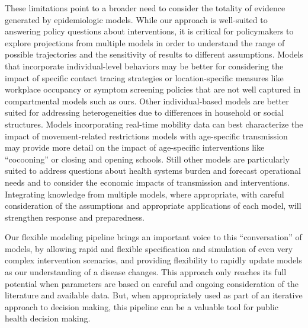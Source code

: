 {These limitations point to a broader need to consider the totality of evidence generated by epidemiologic models. While our approach is well-suited to answering policy questions about interventions, it is critical for policymakers to explore projections from multiple models in order to understand the range of possible trajectories and the sensitivity of results to different assumptions. Models that incorporate individual-level behaviors may be better for considering the impact of specific contact tracing strategies or location-specific measures like workplace occupancy or symptom screening policies that are not well captured in compartmental models such as ours\cite{Kucharski:EffectivenessIsolationTesting:2020,Firth:UsingRealworldNetwork:2020,Hinch:OpenABMCovid19AgentbasedModel:2020}. Other individual-based models are better suited for addressing heterogeneities due to differences in household or social structures\cite{Wilder:ModelingBetweenpopulationVariation:2020,Kerr:CovasimAgentbasedModel:2021}. Models incorporating real-time mobility data can best characterize the impact of movement-related restrictions\cite{Lai:EffectNonpharmaceuticalInterventions:2020} models with age-specific transmission may provide more detail on the impact of age-specific interventions like “cocooning”\cite{Duque:COVID19HowRelax:2020} or closing and opening schools\cite{Ferguson:ReportImpactNonpharmaceutical:2020}. Still other models are particularly suited to address questions about health systems burden and forecast operational needs\cite{Branas:FlatteningCurveIt:2020,LosAlamosNationalLaboratory:COVID19CasesDeaths,Weissman:LocallyInformedSimulation:2020} and to consider the economic impacts of transmission and interventions\cite{Acemoglu:OptimalTargetedLockdowns:2020,Silva:COVIDABSAgentbasedModel:2020}. Integrating knowledge from multiple models, where appropriate, with careful consideration of the assumptions and appropriate applications of each model, will strengthen response and preparedness\cite{Shea:HarnessingMultipleModels:2020}.


Our flexible modeling pipeline brings an important voice to this “conversation” of models, by allowing rapid and flexible specification and simulation of even very complex intervention scenarios, and providing flexibility to rapidly update models as our understanding of a disease changes. This approach only reaches its full potential when parameters are based on careful and ongoing consideration of the literature and available data. But, when appropriately used as part of an iterative approach to decision making, this pipeline can be a valuable tool for public health decision making.

}
